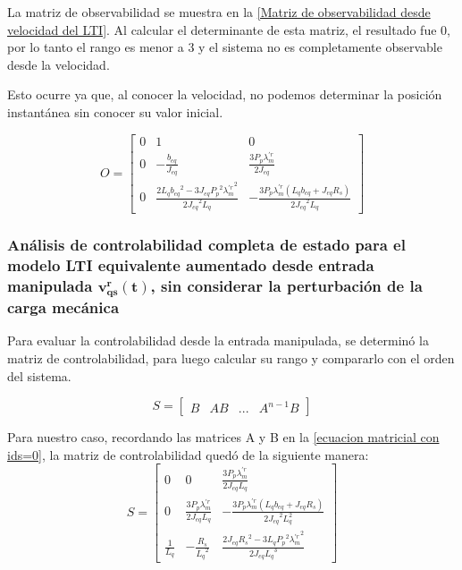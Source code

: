 \documentclass[a4paper, 10pt, onecolumn,journal]{ieeeconf}
\begin{document}
La matriz de observabilidad se muestra en la \cref{Matriz de observabilidad desde velocidad del LTI}.
Al calcular el determinante de esta matriz, el resultado fue 0, por lo tanto el rango es menor a 3 y el sistema no es completamente observable desde la velocidad.

Esto ocurre ya que, al conocer la velocidad, no podemos determinar la posición instantánea sin conocer su valor inicial.

\begin{equation}
	O=
	\begin{bmatrix}
		0 & 1 & 0 \\ 
		0 & -\frac{b_{eq}}{J_{eq}} &\frac{3 P_p \lambda^{'r}_m}{2 J_{eq}}\\
		0 & \frac{2 L_q {b_{eq}}^2 - 3 J_{eq} {P_p}^2 {\lambda^{'r}_m}^2} {2 {J_{eq}}^2 L_q} & -\frac{3 P_p \lambda^{'r}_m \left(L_q b_{eq} + J_{eq} R_s \right)}{2 {J_{eq}}^2 L_q}  
	\end{bmatrix}
	\label{Matriz de observabilidad desde velocidad del LTI}
\end{equation}

\subsubsection{\textbf{Análisis de controlabilidad completa de estado para el modelo LTI equivalente aumentado desde entrada manipulada $\mathbf{v^r_{qs}(t)}$, sin considerar la perturbación de la carga mecánica}}
Para evaluar la controlabilidad desde la entrada manipulada, se determinó la matriz de controlabilidad, para luego calcular su rango y compararlo con el orden del sistema.

\begin{equation}
	S=
	\begin{bmatrix}
		B & AB & ... & A^{n-1}B  
	\end{bmatrix}
	\label{Matriz de controlabilidad generica}
\end{equation}

Para nuestro caso, recordando las matrices A y B en la \cref{ecuacion matricial con ids=0}, la matriz de controlabilidad quedó de la siguiente manera:
\begin{equation}
	S=
	\begin{bmatrix}
		0 & 0 & \frac{3 P_p \lambda^{'r}_m}{2 J_{eq} L_q}\\ 
		0 & \frac{3 P_p \lambda^{'r}_m}{2 J_{eq} L_q} & -\frac{3 P_p \lambda^{'r}_m \left(L_q b_{eq} + J_{eq} R_s \right)}{2 {J_{eq}}^2 L_q^2}\\
		\frac{1}{L_q} & -\frac{R_s}{{L_q}^2} & \frac{2 J_{eq} {R_s}^2 - 3 L_{q} {P_p}^2 {\lambda^{'r}_m}^2} {2 J_{eq} {L_q}^3}  
	\end{bmatrix}
	\label{Matriz de controlabilidad del LTI}
\end{equation}
\end{document}
